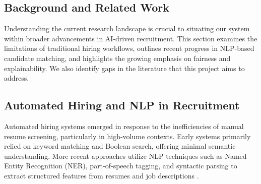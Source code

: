 \documentclass[a4paper]{article}
\begin{document}
\begin{multicols}{2}


\section{Background and Related Work}
Understanding the current research landscape is crucial to situating our system within broader advancements in AI-driven recruitment. This section examines the limitations of traditional hiring workflows, outlines recent progress in NLP-based candidate matching, and highlights the growing emphasis on fairness and explainability. We also identify gaps in the literature that this project aims to address.

\subsection{Automated Hiring and NLP in Recruitment}
Automated hiring systems emerged in response to the inefficiencies of manual resume screening, particularly in high-volume contexts. Early systems primarily relied on keyword matching and Boolean search, offering minimal semantic understanding. More recent approaches utilize NLP techniques such as Named Entity Recognition (NER), part-of-speech tagging, and syntactic parsing to extract structured features from resumes and job descriptions \cite{4}.


\end{multicols}
\end{document}
